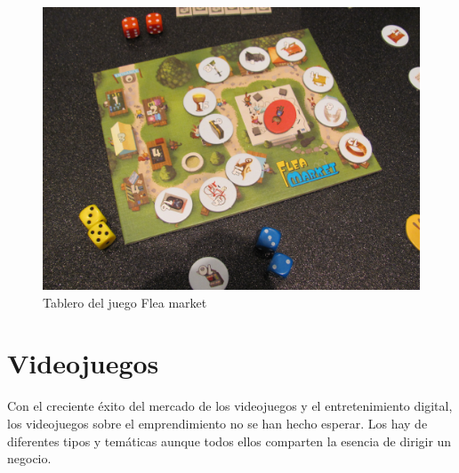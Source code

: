 \begin{description}
\begin{figure}
\begin{center}
\includegraphics[scale=0.4]{imagenes/fleaMarket.jpg}
\caption{Tablero del juego Flea market}
\label{fleaMarket}
\end{center}
\end{figure}

\end{description}


\section{Videojuegos}

Con el creciente éxito del mercado de los videojuegos y el entretenimiento digital, los videojuegos sobre el emprendimiento no se han hecho esperar. Los hay de diferentes tipos y temáticas aunque todos ellos comparten la esencia de dirigir un negocio.

